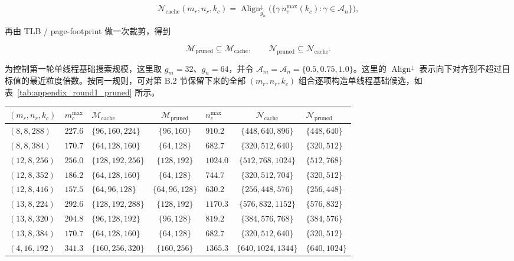 \documentclass[a4paper,11pt,oneside]{article}
\begin{document}
$$
\mathcal{N}_{\text{cache}}(m_r,n_r,k_c)
= \operatorname{Align}^{\downarrow}_{g_n}\bigl(\{\gamma\, n_c^{\max}(k_c) : \gamma \in \mathcal{A}_n\}\bigr),
$$

再由 TLB / page-footprint 做一次裁剪，得到

$$
\mathcal{M}_{\text{pruned}} \subseteq \mathcal{M}_{\text{cache}},
\qquad
\mathcal{N}_{\text{pruned}} \subseteq \mathcal{N}_{\text{cache}}.
$$

为控制第一轮单线程基础搜索规模，这里取 $g_m=32$、$g_n=64$，并令 $\mathcal{A}_m=\mathcal{A}_n=\{0.5,0.75,1.0\}$。这里的 $\operatorname{Align}^{\downarrow}$ 表示向下对齐到不超过目标值的最近粒度倍数。按同一规则，可对第 B.2 节保留下来的全部 $(m_r,n_r,k_c)$ 组合逐项构造单线程基础候选，如表~\ref{tab:appendix_round1_pruned} 所示。

\begin{table}[H]
\centering
\begin{tabular}{lclclcl}
\toprule
\textbf{$(m_r,n_r,k_c)$} & $m_c^{\max}$ & \textbf{$\mathcal{M}_{\text{cache}}$} & \textbf{$\mathcal{M}_{\text{pruned}}$} & $n_c^{\max}$ & \textbf{$\mathcal{N}_{\text{cache}}$} & \textbf{$\mathcal{N}_{\text{pruned}}$} \\
\midrule
$(8,8,288)$   & $227.6$ & $\{96,160,224\}$   & $\{96,160\}$   & $910.2$  & $\{448,640,896\}$     & $\{448,640\}$ \\
$(8,8,384)$   & $170.7$ & $\{64,128,160\}$   & $\{64,128\}$   & $682.7$  & $\{320,512,640\}$     & $\{320,512\}$ \\
$(12,8,256)$  & $256.0$ & $\{128,192,256\}$  & $\{128,192\}$  & $1024.0$ & $\{512,768,1024\}$    & $\{512,768\}$ \\
$(12,8,352)$  & $186.2$ & $\{64,128,160\}$   & $\{64,128\}$   & $744.7$  & $\{320,512,704\}$     & $\{320,512\}$ \\
$(12,8,416)$  & $157.5$ & $\{64,96,128\}$    & $\{64,96,128\}$ & $630.2$ & $\{256,448,576\}$     & $\{256,448\}$ \\
$(13,8,224)$  & $292.6$ & $\{128,192,288\}$  & $\{128,192\}$  & $1170.3$ & $\{576,832,1152\}$    & $\{576,832\}$ \\
$(13,8,320)$  & $204.8$ & $\{96,128,192\}$   & $\{96,128\}$   & $819.2$  & $\{384,576,768\}$     & $\{384,576\}$ \\
$(13,8,384)$  & $170.7$ & $\{64,128,160\}$   & $\{64,128\}$   & $682.7$  & $\{320,512,640\}$     & $\{320,512\}$ \\
$(4,16,192)$  & $341.3$ & $\{160,256,320\}$  & $\{160,256\}$  & $1365.3$ & $\{640,1024,1344\}$   & $\{640,1024\}$ \\

\end{tabular}
\end{table}
\end{document}
